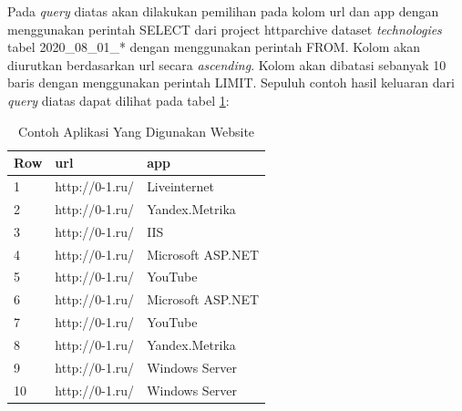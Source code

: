 Pada \textit{query} diatas akan dilakukan pemilihan pada kolom url dan app dengan menggunakan perintah SELECT dari project httparchive dataset \textit{technologies} tabel 2020\_08\_01\_* dengan menggunakan perintah FROM. Kolom akan diurutkan berdasarkan url secara \textit{ascending}. Kolom akan dibatasi sebanyak 10 baris dengan menggunakan perintah LIMIT. Sepuluh contoh hasil keluaran dari \textit{query} diatas dapat dilihat pada tabel \ref{table:contoh_langkah2}:

\begin{table}[H]
\centering
\begin{tabular}{|l|l|l|}
	\hline
	\textbf{Row} & \textbf{url} & \textbf{app}\\
	\hline
	1 & http://0-1.ru/ & Liveinternet\\
	\hline
	2 & http://0-1.ru/ & Yandex.Metrika\\
	\hline
	3 & http://0-1.ru/ & IIS\\
	\hline
	4 & http://0-1.ru/ & Microsoft ASP.NET\\
	\hline
	5 & http://0-1.ru/ & YouTube\\
	\hline
	6 & http://0-1.ru/ & Microsoft ASP.NET\\
	\hline
	7 & http://0-1.ru/ & YouTube\\
	\hline
	8 & http://0-1.ru/ & Yandex.Metrika\\
	\hline
	9 & http://0-1.ru/ & Windows Server\\
	\hline
	10 & http://0-1.ru/ & Windows Server\\
	\hline
\end{tabular}
\caption{Contoh Aplikasi Yang Digunakan Website}
\label{table:contoh_langkah2}
\end{table}

